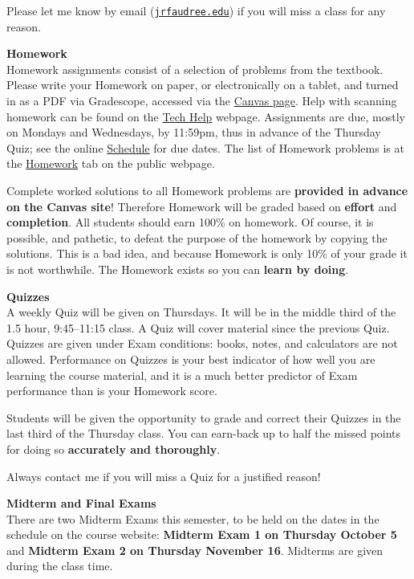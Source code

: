 \documentclass[12pt]{article}
\renewcommand{\emph}[1]{\textsf{\textbf{#1}}}
\newcommand{\localhead}[1]{\par\smallskip\textbf{#1} \smallskip\nobreak\\}%
\def\heading#1{\localhead{\large\emph{#1}}}
\begin{document}
Please let me know by email (\href{mailto:jrfaudree@alaska.edu}{\texttt{jrfaudree\@@alaska.edu}}) if you will miss a class for any reason.


\heading{Homework}
Homework assignments consist of a selection of problems from the textbook.  Please write your Homework on paper, or electronically on a tablet, and turned in as a PDF via Gradescope, accessed via the \href{https://canvas.alaska.edu/courses/16194}{Canvas page}.  Help with scanning homework can be found on the \href{https://uaf-math251.github.io/techHelp.html}{Tech Help} webpage.  Assignments are due, mostly on Mondays and Wednesdays, by 11:59pm, thus in advance of the Thursday Quiz; see the online  \href{https://docs.google.com/spreadsheets/d/e/2PACX-1vTJV11ILVouSFriJJQo6VS7-qBGvXBt6gtQNPTmmScJuiknursixGxHQf12yrBgwkJqETFn31EgQRia/pubhtml}{Schedule} for due dates.  The list of Homework problems is at the \href{https://uaf-math251.github.io/calc2/homework.html}{Homework} tab on the public webpage.

Complete worked solutions to all Homework problems are \emph{provided in advance on the Canvas site}!  Therefore Homework will be graded based on \emph{effort} and \emph{completion}.  All students should earn 100\% on homework.  Of course, it is possible, and pathetic, to defeat the purpose of the homework by copying the solutions.  This is a bad idea, and because Homework is only 10\% of your grade it is not worthwhile.  The Homework exists so you can \emph{learn by doing}.

\heading{Quizzes}
A weekly Quiz will be given on Thursdays.  It will be in the middle third of the 1.5 hour, 9:45--11:15 class.  A Quiz will cover material since the previous Quiz.  Quizzes are given under Exam conditions: books, notes, and calculators are not allowed.  Performance on Quizzes is your best indicator of how well you are learning the course material, and it is a much better predictor of Exam performance than is your Homework score.

Students will be given the opportunity to grade and correct their Quizzes in the last third of the Thursday class.  You can earn-back up to half the missed points for doing so \emph{accurately and thoroughly}.

Always contact me if you will miss a Quiz for a justified reason!  

\heading{Midterm and Final Exams}
There are two Midterm Exams this semester, to be held on the dates in the schedule on the course website: \emph{Midterm Exam 1 on Thursday October 5} and \emph{Midterm Exam 2 on Thursday November 16}.  Midterms are given during the class time.
\end{document}
